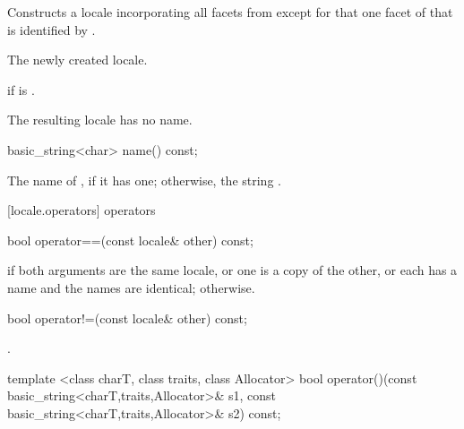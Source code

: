 \begin{itemdescr}
\pnum
\effects
Constructs a locale incorporating
all facets from
except for that one facet of
that is identified by
.

\pnum
\returns
The newly created locale.

\pnum
\throws
{}
if
is .

\pnum
\remarks
The resulting locale has no name.
\end{itemdescr}

%
\begin{itemdecl}
basic_string<char> name() const;
\end{itemdecl}

\begin{itemdescr}
\pnum
\returns
The name of
,
if it has one; otherwise, the string .
\end{itemdescr}

[locale.operators]{ operators}

%
\begin{itemdecl}
bool operator==(const locale& other) const;
\end{itemdecl}

\begin{itemdescr}
\pnum
\returns
{}
if both arguments are the same locale, or one is a copy of the
other, or each has a name and the names are identical;
otherwise.
\end{itemdescr}

%
\begin{itemdecl}
bool operator!=(const locale& other) const;
\end{itemdecl}

\begin{itemdescr}
\pnum
\returns {}.
\end{itemdescr}

%
\begin{itemdecl}
template <class charT, class traits, class Allocator>
  bool operator()(const basic_string<charT,traits,Allocator>& s1,
                  const basic_string<charT,traits,Allocator>& s2) const;
\end{itemdecl}

